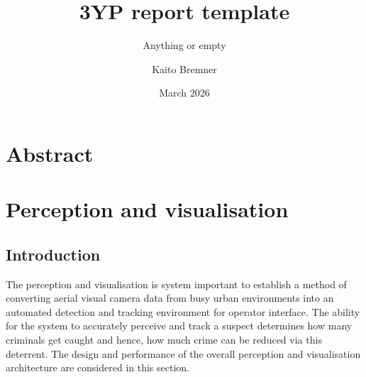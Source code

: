 \documentclass{report_template_oxford}
\title{3YP report template}
\subtitle{Anything or empty}
\author{Kaito Bremner}
\date{March 2026}
\begin{document}
\maketitle

\newpage
{}
\section*{Abstract}

\lipsum[1]

\newpage
\fancyhead[C]{}
\tableofcontents

\newpage
{}
\listoffigures

\newpage
{}
\listoftables

\newpage
{}
\printglossaries

\newpage
{}
\section{Perception and visualisation}







\subsection{Introduction}
The perception and visualisation is system important to establish a method of converting aerial visual camera data from busy urban environments into an automated detection and tracking environment for operator interface. The ability for the system to accurately perceive and track a suspect determines how many criminals get caught and hence, how much crime can be reduced via this deterrent. The design and performance of the overall perception and visualisation architecture are considered in this section. 
\end{document}
